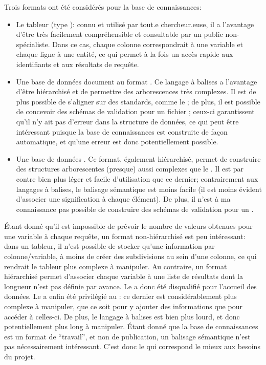 Trois formats ont été considérés pour la base de connaissances:
\begin{itemize}
	\item Le tableur (type \tsv{}): connu et utilisé par tout.e chercheur.euse, il a l'avantage d'être très facilement compréhensible et consultable par un public non-spécialiste. Dans ce cas, chaque colonne correspondrait à une variable et chaque ligne à une entité, ce qui permet à la fois un accès rapide aux identifiants et aux résultats de requête.
	\item Une base de données document au format \xml{}. Ce langage à balises a l'avantage d'être hiérarchisé et de permettre des arborescences très complexes. Il est de plus possible de s'aligner sur des standards, comme le \xmltei{}; de plus, il est possible de concevoir des schémas de validation pour un fichier \xml{}; ceux-ci garantissent qu'il n'y ait pas d'erreur dans la structure de données, ce qui peut être intéressant puisque la base de connaissances est construite de façon automatique, et qu'une erreur est donc potentiellement possible.
	\item Une base de données \json{}. Ce format, également hiérarchisé, permet de construire des structures arborescentes (presque) aussi complexes que le \xml{}. Il est par contre bien plus léger et facile d'utilisation que ce dernier; contrairement aux langages à balises, le balisage sémantique est moins facile (il est moins évident d'associer une signification à chaque élément). De plus, il n'est à ma connaissance pas possible de construire des schémas de validation pour un \json{}.
\end{itemize}

Étant donné qu'il est impossible de prévoir le nombre de valeurs obtenues pour une variable à chaque requête, un format non-hiérarchisé est peu intéressant: dans un tableur, il n'est possible de stocker qu'une information par colonne/variable, à moins de créer des subdivisions au sein d'une colonne, ce qui rendrait le tableur plus complexe à manipuler. Au contraire, un format hiérarchisé permet d'associer chaque variable à une liste de résultats dont la longueur n'est pas définie par avance. Le \tsv{} a donc été disqualifié pour l'accueil des données. Le \json{} a enfin été privilégié au \xml{}: ce dernier est considérablement plus complexe à manipuler, que ce soit pour y ajouter des informations que pour accéder à celles-ci. De plus, le langage à balises est bien plus lourd, et donc potentiellement plus long à manipuler. Étant donné que la base de connaissances est un format de \enquote{travail}, et non de publication, un balisage sémantique n'est pas nécessairement intéressant. C'est donc le \json{} qui correspond le mieux aux besoins du projet. 


